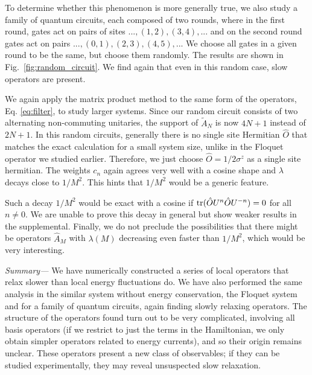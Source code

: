 \documentclass[twocolumn,superscriptaddress, prb]{revtex4-1}
\begin{document}
To determine whether this phenomenon is more generally true, we also study a family of quantum circuits, each composed of two rounds, where in the first round, gates act on pairs of sites $...,(1,2),(3,4),...$ and on the second round gates act on pairs $...,(0,1),(2,3),(4,5),...$
We choose all gates in a given round to be the same, but choose them randomly.
The results are shown in Fig.~\ref{fig:random_circuit}.
We find again that even in this random case, slow operators are present.

We again apply the matrix product method to the same form of the operators, Eq. \eqref{eq:filter},
to study larger systems. Since our random circuit consists of two alternating non-commuting unitaries,
the support of $\tilde{A}_N$ is now $4N+1$ instead of $2N+1$.
In this random circuits, generally there is no single site Hermitian $\hat{O}$
that matches the exact calculation for a small system size, unlike in the Floquet operator we studied earlier.
Therefore, we just choose $\hat{O} = 1/2\sigma^z$ as a single site hermitian.
The weights $c_n$ again agrees very well with a cosine shape and $\lambda$ decays close to $1/M^2$.
This hints that $1/M^2$ would be a generic feature.

Such a decay $1/M^2$ would be exact with a cosine if
${\rm tr}(\hat{O} U^n \hat{O} U^{- n})=0$ for all $n \neq 0$.
We are unable to prove this decay in general but show weaker results in the supplemental.
Finally, we do not preclude the possibilities that
there might be operators $\hat{A}_M$ with $\lambda(M)$ decreasing even faster than $1/M^2$,
which would be very interesting.


{\it Summary---}
We have numerically constructed a series of local operators that relax slower than local energy fluctuations do.
We have also performed the same analysis in the similar system without energy conservation,
the Floquet system and for a family of quantum circuits, again finding slowly relaxing operators.
The structure of the operators found turn out to be very complicated, involving all basis operators
(if we restrict to just the terms in the Hamiltonian, we only obtain simpler operators related to energy currents),
and so their origin remains unclear.
These operators present a new class of observables; if they can be studied experimentally, they may reveal unsuspected slow relaxation.
\end{document}
